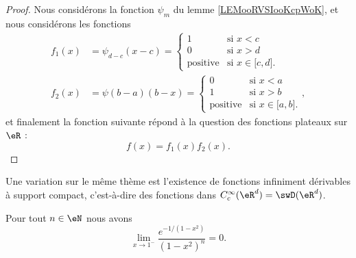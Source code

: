 \begin{proof}
	Nous considérons la fonction \( \psi_m\) du lemme \ref{LEMooRVSIooKcpWoK}, et nous considérons les fonctions
	\begin{subequations}
		\begin{align}
			f_1(x) & =\psi_{d-c}(x-c)=\begin{cases}
				1               & \text{si } x<c                               \\
				0               & \text{si } x>d                               \\
				\text{positive} & \text{si } x\in\mathopen[ c , d \mathclose].
			\end{cases} \\
			f_2(x) & =\psi(b-a)(b-x)=\begin{cases}
				0               & \text{si } x<a                                \\
				1               & \text{si } x>b                                \\
				\text{positive} & \text{si } x\in \mathopen[ a , b \mathclose].
			\end{cases},
		\end{align}
	\end{subequations}
	et finalement la fonction suivante répond à la question des fonctions plateaux sur \( \eR\) :
	\begin{equation}    \label{EqIHAFooXjfcll}
		f(x)=f_1(x)f_2(x).
	\end{equation}
\end{proof}

Une variation sur le même thème est l'existence de fonctions infiniment dérivables à support compact, c'est-à-dire des fonctions dans \(  C^{\infty}_c(\eR^d)=\swD(\eR^d)\).

\begin{lemma}        \label{LEMooLHIFooWpbauN}
    Pour tout \( n\in \eN\) nous avons
    \begin{equation}
        \lim_{x\to 1^-} \frac{   e^{-1/(1-x^2)}  }{ (1-x^2)^n }=0.
    \end{equation}
\end{lemma}

